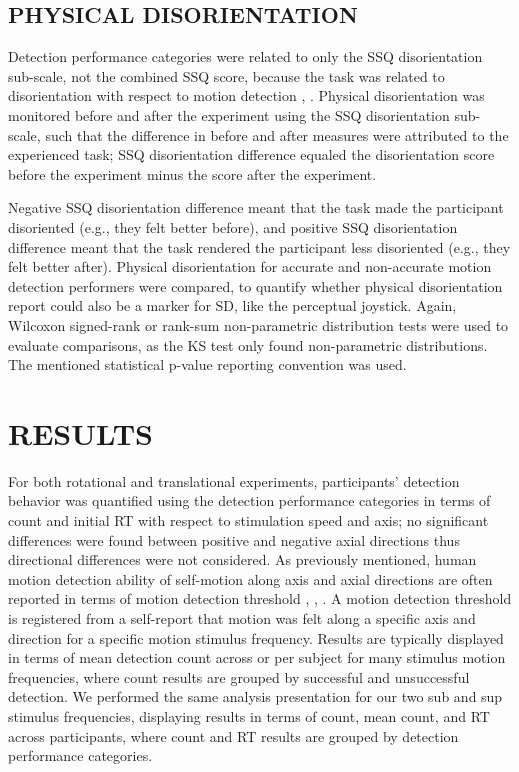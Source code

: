 \documentclass{ieeeaccess}
\begin{document}
\subsection{PHYSICAL DISORIENTATION}
Detection performance categories were related to only the SSQ disorientation sub-scale, not the combined SSQ score, because the task was related to disorientation with respect to motion detection \cite{Kennedy_1993_Simulator}, \cite{Bouchard_2007_SimulatorSickness}. Physical disorientation was monitored before and after the experiment using the SSQ disorientation sub-scale, such that the difference in before and after measures were attributed to the experienced task; SSQ disorientation difference equaled the disorientation score before the experiment minus the score after the experiment.

Negative SSQ disorientation difference meant that the task made the participant disoriented (e.g., they felt better before), and positive SSQ disorientation difference meant that the task rendered the participant less disoriented (e.g., they felt better after). Physical disorientation for accurate and non-accurate motion detection performers were compared, to quantify whether physical disorientation report could also be a marker for SD, like the perceptual joystick. Again, Wilcoxon signed-rank or rank-sum non-parametric distribution tests were used to evaluate comparisons, as the KS test only found non-parametric distributions. The mentioned statistical p-value reporting convention was used.

\section{RESULTS}
For both rotational and translational experiments, participants’ detection behavior was quantified using the detection performance categories in terms of count and initial RT with respect to stimulation speed and axis; no significant differences were found between positive and negative axial directions thus directional differences were not considered. As previously mentioned, human motion detection ability of self-motion along axis and axial directions are often reported in terms of motion detection threshold \cite{Valko_2012_Vestibular}, \cite{Hartmann_2014_Direction}, \cite{Karmali_2017_Multivariate}. A motion detection threshold is registered from a self-report that motion was felt along a specific axis and direction for a specific motion stimulus frequency. Results are typically displayed in terms of mean detection count across or per subject for many stimulus motion frequencies, where count results are grouped by successful and unsuccessful detection. We performed the same analysis presentation for our two sub and sup stimulus frequencies, displaying results in terms of count, mean count, and RT across participants, where count and RT results are grouped by detection performance categories.
\end{document}
